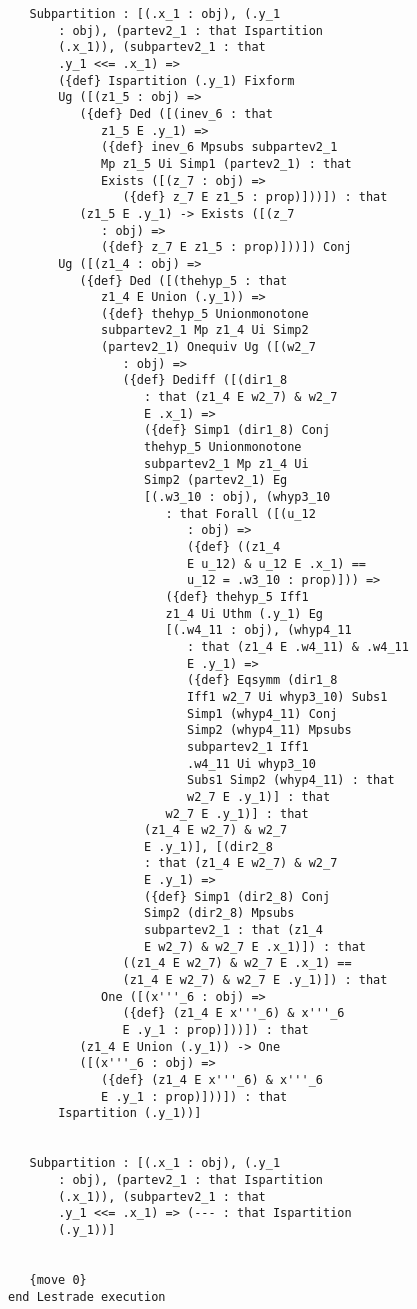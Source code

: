 \documentclass[12pt]{article}
\begin{document}
\begin{verbatim}
   Subpartition : [(.x_1 : obj), (.y_1 
       : obj), (partev2_1 : that Ispartition 
       (.x_1)), (subpartev2_1 : that 
       .y_1 <<= .x_1) => 
       ({def} Ispartition (.y_1) Fixform 
       Ug ([(z1_5 : obj) => 
          ({def} Ded ([(inev_6 : that 
             z1_5 E .y_1) => 
             ({def} inev_6 Mpsubs subpartev2_1 
             Mp z1_5 Ui Simp1 (partev2_1) : that 
             Exists ([(z_7 : obj) => 
                ({def} z_7 E z1_5 : prop)]))]) : that 
          (z1_5 E .y_1) -> Exists ([(z_7 
             : obj) => 
             ({def} z_7 E z1_5 : prop)]))]) Conj 
       Ug ([(z1_4 : obj) => 
          ({def} Ded ([(thehyp_5 : that 
             z1_4 E Union (.y_1)) => 
             ({def} thehyp_5 Unionmonotone 
             subpartev2_1 Mp z1_4 Ui Simp2 
             (partev2_1) Onequiv Ug ([(w2_7 
                : obj) => 
                ({def} Dediff ([(dir1_8 
                   : that (z1_4 E w2_7) & w2_7 
                   E .x_1) => 
                   ({def} Simp1 (dir1_8) Conj 
                   thehyp_5 Unionmonotone 
                   subpartev2_1 Mp z1_4 Ui 
                   Simp2 (partev2_1) Eg 
                   [(.w3_10 : obj), (whyp3_10 
                      : that Forall ([(u_12 
                         : obj) => 
                         ({def} ((z1_4 
                         E u_12) & u_12 E .x_1) == 
                         u_12 = .w3_10 : prop)])) => 
                      ({def} thehyp_5 Iff1 
                      z1_4 Ui Uthm (.y_1) Eg 
                      [(.w4_11 : obj), (whyp4_11 
                         : that (z1_4 E .w4_11) & .w4_11 
                         E .y_1) => 
                         ({def} Eqsymm (dir1_8 
                         Iff1 w2_7 Ui whyp3_10) Subs1 
                         Simp1 (whyp4_11) Conj 
                         Simp2 (whyp4_11) Mpsubs 
                         subpartev2_1 Iff1 
                         .w4_11 Ui whyp3_10 
                         Subs1 Simp2 (whyp4_11) : that 
                         w2_7 E .y_1)] : that 
                      w2_7 E .y_1)] : that 
                   (z1_4 E w2_7) & w2_7 
                   E .y_1)], [(dir2_8 
                   : that (z1_4 E w2_7) & w2_7 
                   E .y_1) => 
                   ({def} Simp1 (dir2_8) Conj 
                   Simp2 (dir2_8) Mpsubs 
                   subpartev2_1 : that (z1_4 
                   E w2_7) & w2_7 E .x_1)]) : that 
                ((z1_4 E w2_7) & w2_7 E .x_1) == 
                (z1_4 E w2_7) & w2_7 E .y_1)]) : that 
             One ([(x'''_6 : obj) => 
                ({def} (z1_4 E x'''_6) & x'''_6 
                E .y_1 : prop)]))]) : that 
          (z1_4 E Union (.y_1)) -> One 
          ([(x'''_6 : obj) => 
             ({def} (z1_4 E x'''_6) & x'''_6 
             E .y_1 : prop)]))]) : that 
       Ispartition (.y_1))]


   Subpartition : [(.x_1 : obj), (.y_1 
       : obj), (partev2_1 : that Ispartition 
       (.x_1)), (subpartev2_1 : that 
       .y_1 <<= .x_1) => (--- : that Ispartition 
       (.y_1))]


   {move 0}
end Lestrade execution
\end{verbatim}
\end{document}
